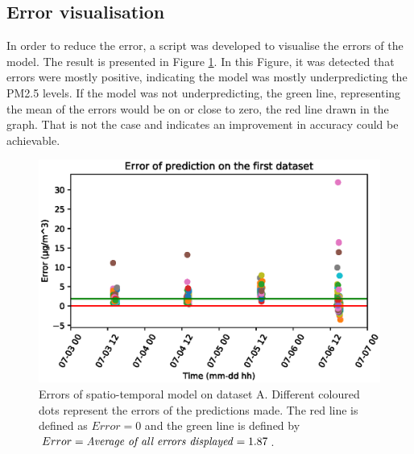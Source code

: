 \begin{table}[H]
\centering
{}
\caption{Spatio-temporal MAE results and Analysis}
\label{tab:spatiotemporal}
\end{table}

\subsection{Error visualisation}
In order to reduce the error, a script was developed to visualise the errors of the model. The result is presented in Figure \ref{fig:error_st}. In this Figure, it was detected that errors were mostly positive, indicating the model was mostly underpredicting the PM2.5 levels. If the model was not underpredicting, the green line, representing the mean of the errors would be on or close to zero, the red line drawn in the graph. That is not the case and indicates an improvement in accuracy could be achievable.


\begin{figure}[H] 
\centering
\includegraphics[width=\linewidth]{images/daily_error_with_line.eps} 
\caption{Errors of spatio-temporal model on dataset A. Different coloured dots represent the errors of the predictions made. The red line is defined as $Error = 0$ and the green line is defined by $Error = \textrm{\textit{Average of all errors displayed}} = 1.87 $.}
\label{fig:error_st}
\end{figure}

